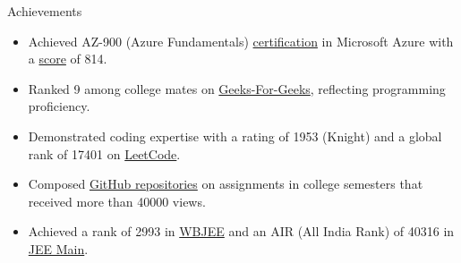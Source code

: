 \documentclass{resume} %
\begin{document}
\begin{rSection}{Achievements} 
\begin{itemize}
\setlength\itemsep{-1.75em} %
     \item Achieved AZ-900 (Azure Fundamentals) \href{https://learn.microsoft.com/en-in/users/arkapratimghosh-4932/credentials/certification-o-/azure-fundamentals}{certification} in Microsoft Azure with a \href{https://drive.google.com/file/d/1s7vbb-FW7VGSNXz2BCDkJnFmuanPQLEC/view}{score} of 814. \\
    \item   Ranked 9 among college mates on \href{https://www.geeksforgeeks.org/user/arkapratimghosh20021/?utm_source=geeksforgeeks&utm_medium=my_profile&utm_campaign=auth_user}{Geeks-For-Geeks}, reflecting programming proficiency. \\
    \item Demonstrated coding expertise with a rating of 1953 (Knight) and a global rank of 17401 on \href{https://leetcode.com/21Arka2002/}{LeetCode}. \\
    \item Composed \href{https://github.com/arkapg211002/TotalViewsProjectRepoReadme}{GitHub repositories} on assignments in college semesters that received more than 40000 views. \\
    \item Achieved a rank of 2993 in \href{https://drive.google.com/file/d/1xc6hvBjQhrxccVi4ENYZc62iL98IfvNh/view}{WBJEE} and an AIR (All India Rank) of 40316 in \href{https://drive.google.com/file/d/1xjdXfsoL_L62ij-P8jDuyyKQw9I1_Ht0/view}{JEE Main}.
\end{itemize}

% 

\end{rSection}




\end{document}
